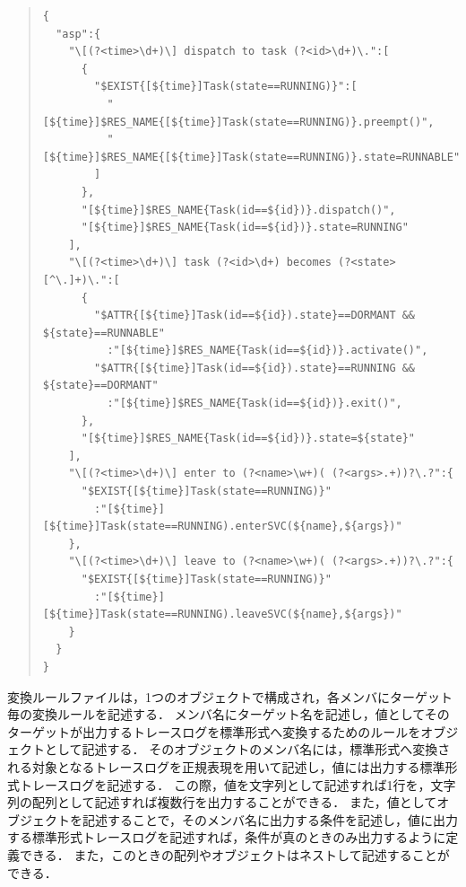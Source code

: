 \begin{table}[h]
{\scriptsize
\begin{quote}
\bkcounttrue
\begin{breakbox}
\setlength{\baselineskip}{0.8\normalbaselineskip}
\begin{verbatim}
{
  "asp":{
    "\[(?<time>\d+)\] dispatch to task (?<id>\d+)\.":[
      {
        "$EXIST{[${time}]Task(state==RUNNING)}":[
          "[${time}]$RES_NAME{[${time}]Task(state==RUNNING)}.preempt()",
          "[${time}]$RES_NAME{[${time}]Task(state==RUNNING)}.state=RUNNABLE"
        ]
      },
      "[${time}]$RES_NAME{Task(id==${id})}.dispatch()",
      "[${time}]$RES_NAME{Task(id==${id})}.state=RUNNING"
    ],
    "\[(?<time>\d+)\] task (?<id>\d+) becomes (?<state>[^\.]+)\.":[
      {
        "$ATTR{[${time}]Task(id==${id}).state}==DORMANT && ${state}==RUNNABLE"
          :"[${time}]$RES_NAME{Task(id==${id})}.activate()",
        "$ATTR{[${time}]Task(id==${id}).state}==RUNNING && ${state}==DORMANT"
          :"[${time}]$RES_NAME{Task(id==${id})}.exit()",
      },
      "[${time}]$RES_NAME{Task(id==${id})}.state=${state}"
    ],
    "\[(?<time>\d+)\] enter to (?<name>\w+)( (?<args>.+))?\.?":{
      "$EXIST{[${time}]Task(state==RUNNING)}"
        :"[${time}][${time}]Task(state==RUNNING).enterSVC(${name},${args})"
    },
    "\[(?<time>\d+)\] leave to (?<name>\w+)( (?<args>.+))?\.?":{
      "$EXIST{[${time}]Task(state==RUNNING)}"
        :"[${time}][${time}]Task(state==RUNNING).leaveSVC(${name},${args})"
    }
  }
}
\end{verbatim}
\end{breakbox}
\caption{変換ルールファイルの例}
\label{convertRuleFileSample}
\end{quote}
}
\end{table}

変換ルールファイルは，1つのオブジェクトで構成され，各メンバにターゲット毎の変換ルールを記述する．
メンバ名にターゲット名を記述し，値としてそのターゲットが出力するトレースログを標準形式へ変換するためのルールをオブジェクトとして記述する．
そのオブジェクトのメンバ名には，標準形式へ変換される対象となるトレースログを正規表現を用いて記述し，値には出力する標準形式トレースログを記述する．
この際，値を文字列として記述すれば1行を，文字列の配列として記述すれば複数行を出力することができる．
また，値としてオブジェクトを記述することで，そのメンバ名に出力する条件を記述し，値に出力する標準形式トレースログを記述すれば，条件が真のときのみ出力するように定義できる．
また，このときの配列やオブジェクトはネストして記述することができる．

